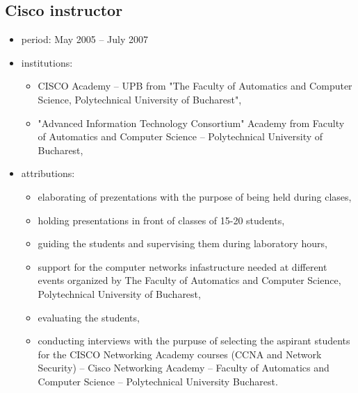 \documentclass[a4paper,12pt,openany]{article}
\begin{document}
	\subsection{Cisco instructor}
		\begin{itemize}
			\item period: May 2005 – July 2007 
			\item institutions: 
			\begin{itemize}
			 	\item CISCO Academy – UPB from "The Faculty of Automatics and Computer Science, Polytechnical University of Bucharest", 
				\item "Advanced Information Technology Consortium" Academy from Faculty of Automatics and Computer Science – Polytechnical University of Bucharest,
			\end{itemize}
			\item attributions:
			\begin{itemize}
			 	\item elaborating of prezentations with the purpose of being held during clases,
				\item holding presentations in front of classes of 15-20 students,
				\item guiding the students and supervising them during laboratory hours,
				\item support for the computer networks infastructure needed at different events organized by The Faculty of Automatics and Computer Science, Polytechnical University of Bucharest,
				\item evaluating the students,
				\item conducting interviews with the purpuse of selecting the aspirant students for the CISCO Networking Academy courses (CCNA and Network Security) – Cisco Networking Academy – Faculty of Automatics and Computer Science – Polytechnical University Bucharest. 
	
			\end{itemize}
		\end{itemize}
\end{document}
